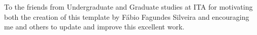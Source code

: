 \maketitle

\begin{itadedication}
To the friends from Undergraduate and Graduate studies at ITA for motivating both the creation of this template by Fábio Fagundes Silveira and encouraging me and others to update and improve this excellent work.
\end{itadedication}

\begin{itathanks}

\end{itathanks}

\thispagestyle{empty}
\ifhyperref{}\fi
\begin{flushright}
\begin{spacing}{1}
\mbox{}\vfill

\end{spacing}
\end{flushright}

\begin{abstract}
\noindent

\end{abstract}

\begin{englishabstract}
\noindent

\end{englishabstract}

\listoffigures %

\listoftables %

\listofabbreviations

\listofsymbols

\tableofcontents
